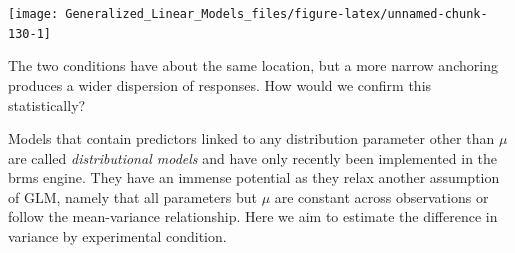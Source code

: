 \documentclass[]{svmono}
\newenvironment{Shaded}{\begin{snugshade}}{\end{snugshade}}
\newcommand{\KeywordTok}[1]{\textcolor[rgb]{0.13,0.29,0.53}{\textbf{#1}}}
\newcommand{\DataTypeTok}[1]{\textcolor[rgb]{0.13,0.29,0.53}{#1}}
\newcommand{\DecValTok}[1]{\textcolor[rgb]{0.00,0.00,0.81}{#1}}
\newcommand{\StringTok}[1]{\textcolor[rgb]{0.31,0.60,0.02}{#1}}
\newcommand{\OperatorTok}[1]{\textcolor[rgb]{0.81,0.36,0.00}{\textbf{#1}}}
\newcommand{\NormalTok}[1]{#1}
\begin{document}
\begin{Shaded}
\end{Shaded}

\texttt{[image: Generalized\_Linear\_Models\_files/figure-latex/unnamed-chunk-130-1]}

The two conditions have about the same location, but a more narrow
anchoring produces a wider dispersion of responses. How would we confirm
this statistically?

Models that contain predictors linked to any distribution parameter
other than \(\mu\) are called \emph{distributional models} and have only
recently been implemented in the brms engine. They have an immense
potential as they relax another assumption of GLM, namely that all
parameters but \(\mu\) are constant across observations or follow the
mean-variance relationship. Here we aim to estimate the difference in
variance by experimental condition.
\end{document}
